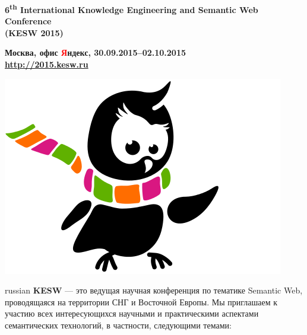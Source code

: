 \documentclass[a4paper, 10pt]{article}
\newcommand{\rus}[1]{\foreignlanguage{russian}{#1}}
\renewcommand{\skip}{\vspace{1ex}}
\begin{document}
\begin{minipage}{.80\textwidth}
\begin{center}

\Large{\bf 6\textsuperscript{th} International Knowledge Engineering and Semantic Web Conference 
\\ (KESW 2015)}

\skip\skip

\large{\bf \rus{Москва, офис \textcolor{red}{Я}ндекс}, 30.09.2015--02.10.2015  \\ \url{http://2015.kesw.ru}}
\end{center}

\end{minipage}
\hfill
\begin{minipage}{.21\textwidth}

\includegraphics[width=\textwidth]{kesw}

\end{minipage}

\skip\skip

\begin{otherlanguage*}{russian}
\noindent
\textbf{KESW} --- это ведущая научная конференция по тематике Semantic Web,
проводящаяся на территории СНГ и Восточной Европы. Мы приглашаем к участию всех интересующихся научными и практическими аспектами семантических технологий, в частности, следующими темами:
\end{otherlanguage*}

\skip
\skip
\end{document}
